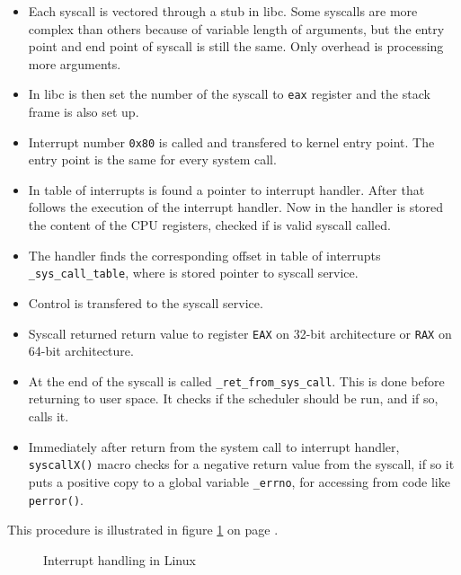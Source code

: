 \begin{itemize}
	\item Each syscall is vectored through a stub in libc. Some syscalls are more complex than others because of variable length of arguments, but the entry point and end point of syscall is still the same. Only overhead is processing more arguments.
	\item In libc is then set the number of the syscall to \texttt{eax} register and the stack frame is also set up.
	\item Interrupt number \texttt{0x80} is called and transfered to kernel entry point. The entry point is the same for every system call.
	\item In table of interrupts is found a pointer to interrupt handler. After that follows the execution of the interrupt handler. Now in the handler is stored the content of the CPU registers, checked if is valid syscall called.
	\item The handler finds the corresponding offset in table of interrupts \texttt{\_sys\_call\_table}, where is stored pointer to syscall service.
	\item Control is transfered to the syscall service.
	\item Syscall returned return value to register \texttt{EAX} on 32-bit architecture or \texttt{RAX} on 64-bit architecture.
	\item At the end of the syscall is called \texttt{\_ret\_from\_sys\_call\(\)}. This is done before returning to user space. It checks if the scheduler should be run, and if so, calls it.
	\item Immediately after return from the system call to interrupt handler, \texttt{syscallX()} macro checks for a negative return value from the syscall, if so it puts a positive copy to a global variable \texttt{\_errno}, for accessing from code like \texttt{perror()}.
\end{itemize}

This procedure is illustrated in figure \ref{fig:tikz:int_handling} on page \pageref{fig:tikz:int_handling}.

\begin{figure}[H]
  \centering
  \caption{Interrupt handling in Linux}
  \label{fig:tikz:int_handling}
\end{figure}


% 

